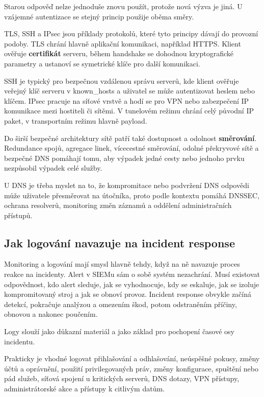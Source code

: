 Starou odpověď nelze jednoduše znovu použít, protože nová výzva je jiná. U vzájemné autentizace se stejný princip použije oběma směry.

TLS, SSH a IPsec jsou příklady protokolů, které tyto principy dávají do provozní podoby. TLS chrání hlavně aplikační komunikaci, například HTTPS. Klient ověřuje \textbf{certifikát} serveru, během handshake se dohodnou kryptografické parametry a ustanoví se symetrické klíče pro další komunikaci.

SSH je typický pro bezpečnou vzdálenou správu serverů, kde klient ověřuje veřejný klíč serveru v known\_hosts a uživatel se může autentizovat heslem nebo klíčem. IPsec pracuje na síťové vrstvě a hodí se pro VPN nebo zabezpečení IP komunikace mezi hostiteli či sítěmi. V tunelovém režimu chrání celý původní IP paket, v transportním režimu hlavně payload.

Do širší bezpečné architektury sítě patří také dostupnost a odolnost \textbf{směrování}. Redundance spojů, agregace linek, vícecestné směrování, odolné překryvové sítě a bezpečné DNS pomáhají tomu, aby výpadek jedné cesty nebo jednoho prvku nezpůsobil výpadek celé služby.

U DNS je třeba myslet na to, že kompromitace nebo podvržení DNS odpovědi může uživatele přesměrovat na útočníka, proto podle kontextu pomáhá DNSSEC, ochrana resolverů, monitoring změn záznamů a oddělení administračních přístupů.

\subsection*{Jak logování navazuje na incident response}

Monitoring a logování mají smysl hlavně tehdy, když na ně navazuje proces reakce na incidenty. Alert v SIEMu sám o sobě systém nezachrání. Musí existovat odpovědnost, kdo alert sleduje, jak se vyhodnocuje, kdy se eskaluje, jak se izoluje kompromitovaný stroj a jak se obnoví provoz. Incident response obvykle začíná detekcí, pokračuje analýzou a omezením škod, potom odstraněním příčiny, obnovou a nakonec poučením.

Logy slouží jako důkazní materiál a jako základ pro pochopení časové osy incidentu.

Prakticky je vhodné logovat přihlašování a odhlašování, neúspěšné pokusy, změny účtů a oprávnění, použití privilegovaných práv, změny konfigurace, spuštění nebo pád služeb, síťová spojení u kritických serverů, DNS dotazy, VPN přístupy, administrátorské akce a přístupy k citlivým datům.

